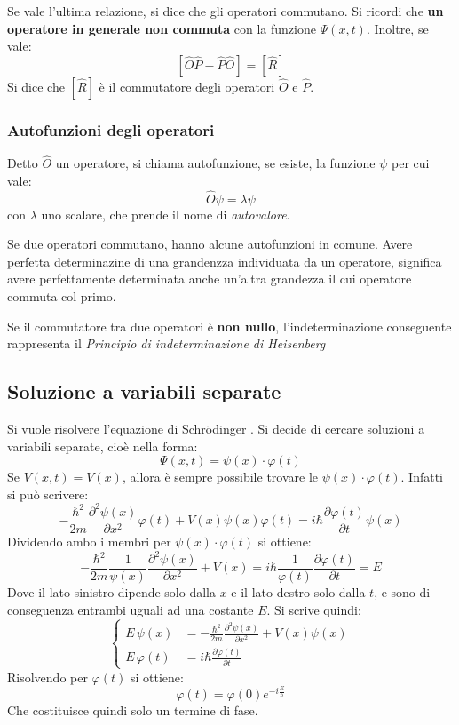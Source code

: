 \documentclass{article}
\newcommand{\schr}{Schr\"odinger }
\begin{document}
Se vale l'ultima relazione, si dice che gli operatori commutano. Si ricordi che \textbf{un operatore in generale non commuta} con la funzione \(\Psi(x,t)\). Inoltre, se vale:
\[\left[ \hat O \hat P-\hat P \hat O\right]=\left[\hat R\right]\]
Si dice che \([\hat R]\) è il commutatore degli operatori  \(\hat O\) e \(\hat P\).

\subsubsection{Autofunzioni degli operatori}
Detto \(\hat O\) un operatore, si chiama autofunzione, se esiste, la funzione \(\psi\) per cui vale:
\[ \hat O \psi = \lambda \psi\]
con \( \lambda \) uno scalare, che prende il nome di \emph{autovalore}.

Se due operatori commutano, hanno alcune autofunzioni in comune. Avere perfetta determinazine di una grandenzza individuata da un operatore, significa avere perfettamente determinata anche un'altra grandezza il cui operatore commuta col primo.

Se il commutatore tra due operatori è \textbf{non nullo}, l'indeterminazione conseguente rappresenta il \emph{Principio di indeterminazione di Heisenberg}



\subsection{Soluzione a variabili separate}
Si vuole risolvere l'equazione di \schr. Si decide di cercare soluzioni a variabili separate, cioè nella forma:
\[ \Psi(x,t) = \psi(x)\cdot \varphi (t) \]
Se \(V(x,t) = V(x)\), allora è sempre possibile trovare le \(\psi(x)\cdot \varphi (t)\). Infatti si può scrivere:
\[-\frac{\hbar^2}{2m}\frac{\partial^2\psi(x) }{\partial x^2}\varphi (t) +
V(x)\psi(x)\varphi(t)=i\hbar\frac{\partial \varphi(t)}{\partial t} \psi(x) \]
Dividendo ambo i membri per \(\psi(x)\cdot \varphi (t)\) si ottiene:
\[-\frac{\hbar^2}{2m}\frac{1}{\psi(x)}\frac{\partial^2\psi(x) }{\partial x^2} + V(x)=i\hbar\frac{1}{\varphi(t)}\frac{\partial \varphi(t)}{\partial t} = E \]
Dove il lato sinistro dipende solo dalla \(x\) e il lato destro solo dalla \(t\), e sono di conseguenza entrambi uguali ad una costante \(E\).  Si scrive quindi:
\[
\begin{cases}
E\,\psi(x) &= -\frac{\hbar^2}{2m}\frac{\partial^2\psi(x) }{\partial x^2}+V(x)\psi(x)\\
E\,\varphi(t) &=  i\hbar\frac{\partial \varphi(t)}{\partial t} 
\end{cases}
\]
Risolvendo per \(\varphi(t)\) si ottiene:
\[\varphi(t) = \varphi(0) e^{-i\frac{E}{\hbar}} \]
Che costituisce quindi solo un termine di fase.
\end{document}
